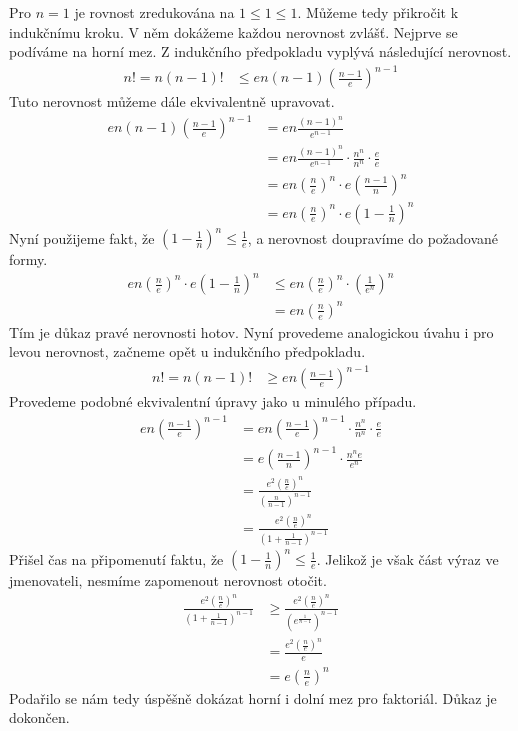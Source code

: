 \begin{t_proof}
  Pro $n=1$ je rovnost zredukována na $1\leq 1\leq 1$. Můžeme tedy přikročit k indukčnímu kroku. V něm dokážeme každou nerovnost zvlášť. Nejprve se podíváme na horní mez. Z indukčního předpokladu vyplývá následující nerovnost.
  \begin{align*}
    n! = n(n-1)! &\leq en(n-1)\left(\frac{n-1}{e}\right)^{n-1}
  \end{align*}
  Tuto nerovnost můžeme dále ekvivalentně upravovat.
  \begin{align*}
    en(n-1)\left(\frac{n-1}{e}\right)^{n-1}
    &= en\frac{(n-1)^n}{e^{n-1}}\\
    &= en\frac{(n-1)^n}{e^{n-1}}\cdot\frac{n^n}{n^n}\cdot\frac{e}{e}\\
    &= en\left(\frac{n}{e}\right)^n\cdot e\left(\frac{n-1}{n}\right)^n\\
    &= en\left(\frac{n}{e}\right)^n\cdot e\left(1-\frac{1}{n}\right)^n
  \end{align*}
  Nyní použijeme fakt, že $\left(1-\frac{1}{n}\right)^n\leq \frac{1}{e}$, a nerovnost doupravíme do požadované formy.
  \begin{align*}
    en\left(\frac{n}{e}\right)^n\cdot e\left(1-\frac{1}{n}\right)^n
    &\leq en\left(\frac{n}{e}\right)^n\cdot \left(\frac{1}{e^n}\right)^n\\
    &= en\left(\frac{n}{e}\right)^n
  \end{align*}
  Tím je důkaz pravé nerovnosti hotov. Nyní provedeme analogickou úvahu i pro levou nerovnost, začneme opět u indukčního předpokladu.
  \begin{align*}
    n! = n(n-1)! &\geq en\left(\frac{n-1}{e}\right)^{n-1}
  \end{align*}
  Provedeme podobné ekvivalentní úpravy jako u minulého případu.
  \begin{align*}
    en\left(\frac{n-1}{e}\right)^{n-1}
    &= en\left(\frac{n-1}{e}\right)^{n-1}\cdot\frac{n^n}{n^n}\cdot\frac{e}{e}\\
    &= e\left(\frac{n-1}{n}\right)^{n-1}\cdot\frac{n^ne}{e^{n}}\\
    &= \frac{e^2\left(\frac{n}{e}\right)^n}{\left(\frac{n}{n-1}\right)^{n-1}}\\
    &= \frac{e^2\left(\frac{n}{e}\right)^n}{\left(1+\frac{1}{n-1}\right)^{n-1}}
  \end{align*}
  Přišel čas na připomenutí faktu, že $\left(1-\frac{1}{n}\right)^n\leq \frac{1}{e}$. Jelikož je však část výraz ve jmenovateli, nesmíme zapomenout nerovnost otočit.
  \begin{align*}
    \frac{e^2\left(\frac{n}{e}\right)^n}{\left(1+\frac{1}{n-1}\right)^{n-1}}
    &\geq \frac{e^2\left(\frac{n}{e}\right)^n}{\left(e^{\frac{1}{n-1}}\right)^{n-1}}\\
    &= \frac{e^2\left(\frac{n}{e}\right)^n}{e}\\
    &= e\left(\frac{n}{e}\right)^n
  \end{align*}
  Podařilo se nám tedy úspěšně dokázat horní i dolní mez pro faktoriál. Důkaz je dokončen.
\end{t_proof}


